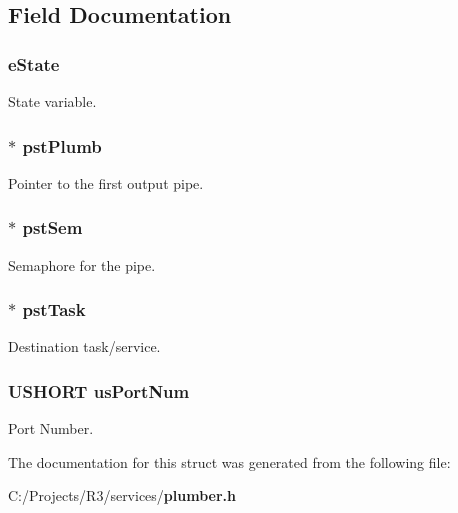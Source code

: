 \subsection{Field Documentation}
\subsubsection[{eState}]{ {\bf eState}}\label{struct_p_l_u_m_b___t_a_b_l_e___e_n_t_r_y_a739f066b2015951e766b4c5470112894}


State variable. 
\subsubsection[{pstPlumb}]{$\ast$ {\bf pstPlumb}}\label{struct_p_l_u_m_b___t_a_b_l_e___e_n_t_r_y_a9f36c6978eb451deb62fcadfb7651fc0}


Pointer to the first output pipe. 
\subsubsection[{pstSem}]{$\ast$ {\bf pstSem}}\label{struct_p_l_u_m_b___t_a_b_l_e___e_n_t_r_y_a1867eb1c7a81c3c5e9033b7d8da6cd76}


Semaphore for the pipe. 
\subsubsection[{pstTask}]{$\ast$ {\bf pstTask}}\label{struct_p_l_u_m_b___t_a_b_l_e___e_n_t_r_y_a4618a48c8e1a4c67b6f49bf6e75b510d}


Destination task/service. 
\subsubsection[{usPortNum}]{\setlength{\rightskip}{0pt plus 5cm}USHORT {\bf usPortNum}}\label{struct_p_l_u_m_b___t_a_b_l_e___e_n_t_r_y_a75dce482105fb0bfe6879a8071b67702}


Port Number. 

The documentation for this struct was generated from the following file:\begin{DoxyCompactItemize}
\item 
C:/Projects/R3/services/{\bf plumber.h}\end{DoxyCompactItemize}
